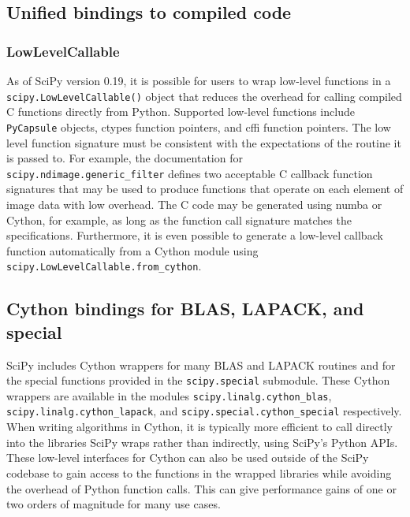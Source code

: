 \documentclass[fleqn,10pt]{wlscirep}
\begin{document}
\subsection*{Unified bindings to compiled code}

\subsubsection*{LowLevelCallable}

As of SciPy version 0.19, it is possible for users to wrap low-level functions
in a \texttt{scipy.LowLevelCallable()} object that reduces the overhead for
calling compiled C functions directly from Python.  Supported low-level
functions include \texttt{PyCapsule} objects, ctypes function pointers, and
cffi function pointers. The low level function signature must be consistent
with the expectations of the routine it is passed to. For example, the
documentation for \texttt{scipy.ndimage.generic\_filter} defines two acceptable
C callback function signatures that may be used to produce functions that
operate on each element of image data with low overhead. The C code may be
generated using numba or Cython, for example, as long as the function call
signature matches the specifications. Furthermore, it is even possible to
generate a low-level callback function automatically from a Cython module using
\texttt{scipy.LowLevelCallable.from\_cython}.

\subsection*{Cython bindings for BLAS, LAPACK, and special}

SciPy includes Cython\cite{behnel2011cython} wrappers for many BLAS and
LAPACK\cite{LAPACK} routines and for the special functions provided in the
\texttt{scipy.{\allowbreak}special} submodule.  These Cython wrappers are
available in the modules
\texttt{scipy.{\allowbreak}linalg.{\allowbreak}cython\_blas},
\texttt{scipy.{\allowbreak}linalg.{\allowbreak}cython\_lapack}, and
\texttt{scipy.{\allowbreak}special.{\allowbreak}cython\_special} respectively.
When writing algorithms in Cython, it is typically more efficient to call
directly into the libraries SciPy wraps rather than indirectly, using SciPy's
Python APIs.  These low-level interfaces for Cython can also be used outside of
the SciPy codebase to gain access to the functions in the wrapped libraries
while avoiding the overhead of Python function calls.  This can give
performance gains of one or two orders of magnitude for many use cases.
\end{document}
